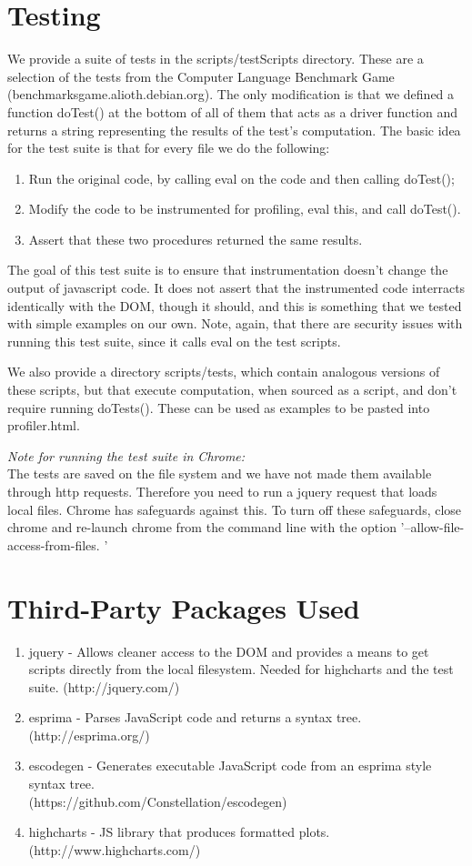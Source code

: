 \documentclass[11pt]{article}
\begin{document}
\section{Testing}
We provide a suite of tests in the scripts/testScripts
directory. These are a selection of the tests from the Computer
Language Benchmark Game (benchmarksgame.alioth.debian.org). The only
modification is that we defined a function doTest() at the bottom of
all of them that acts as a driver function and returns a string
representing the results of the test's computation. The basic idea for
the test suite is that for every file we do the following:
\begin{enumerate}
\item Run the original code, by calling eval on the code and then
  calling doTest();
\item Modify the code to be instrumented for profiling, eval this, and call
  doTest().
\item Assert that these two procedures returned the same results. 
\end{enumerate}
The goal of this test suite is to ensure that instrumentation doesn't
change the output of javascript code. It does not assert that the
instrumented code interracts identically with the DOM, though it
should, and this is something that we tested with simple examples on
our own. Note, again, that there are security issues with running this
test suite, since it calls eval on the test scripts. 

We also provide a directory scripts/tests, which contain analogous
versions of these scripts, but that execute computation, when sourced
as a script, and don't require running doTests(). These can be used as
examples to be pasted into profiler.html.

\textit{Note for running the test suite in Chrome: }\\
The tests are saved on the file system and we have not made them
available through http requests. Therefore you need to run a jquery
request that loads local files. Chrome has safeguards against this. To
turn off these safeguards, close chrome and re-launch chrome from the command
line with the option '--allow-file-access-from-files. '

\section{Third-Party Packages Used}
\begin{enumerate}
\item jquery - Allows cleaner access to the DOM and provides a means
  to get scripts directly from the local filesystem. Needed for highcharts
  and the test suite. (http://jquery.com/)
\item esprima - Parses JavaScript code and returns a syntax tree. (http://esprima.org/)
\item escodegen - Generates executable JavaScript code from an esprima style syntax tree. \\(https://github.com/Constellation/escodegen)
\item highcharts - JS library that produces formatted plots. (http://www.highcharts.com/)
\end{enumerate}
\end{document}
